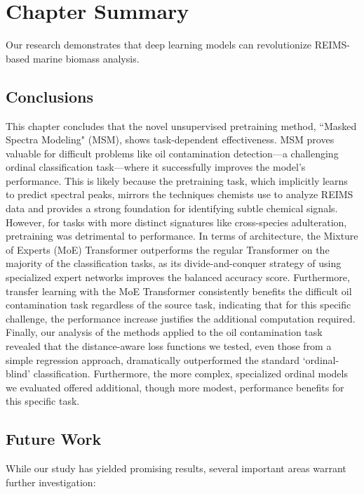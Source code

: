 \section{Chapter Summary}
\label{sec:conclusion-and-future-work}

Our research demonstrates that deep learning models can revolutionize REIMS-based marine biomass analysis.

\subsection{Conclusions}

This chapter concludes that the novel unsupervised pretraining method, ``Masked Spectra Modeling" (MSM), shows task-dependent effectiveness. MSM proves valuable for difficult problems like oil contamination detection—a challenging ordinal classification task—where it successfully improves the model's performance. This is likely because the pretraining task, which implicitly learns to predict spectral peaks, mirrors the techniques chemists use to analyze REIMS data and provides a strong foundation for identifying subtle chemical signals. However, for tasks with more distinct signatures like cross-species adulteration, pretraining was detrimental to performance.
In terms of architecture, the Mixture of Experts (MoE) Transformer outperforms the regular Transformer on the majority of the classification tasks, as its divide-and-conquer strategy of using specialized expert networks improves the balanced accuracy score. Furthermore, transfer learning with the MoE Transformer consistently benefits the difficult oil contamination task regardless of the source task, indicating that for this specific challenge, the performance increase justifies the additional computation required.
Finally, our analysis of the methods applied to the oil contamination task revealed that the distance-aware loss functions we tested, even those from a simple regression approach, dramatically outperformed the standard `ordinal-blind' classification. Furthermore, the more complex, specialized ordinal models we evaluated offered additional, though more modest, performance benefits for this specific task.

\subsection{Future Work}

While our study has yielded promising results, several important areas warrant further investigation:

